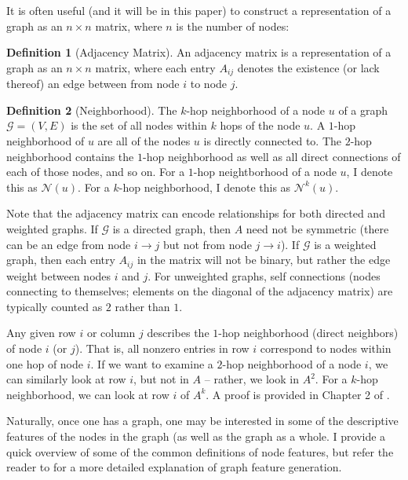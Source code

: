 \documentclass[12pt]{article}
\theoremstyle{definition}
\newtheorem{definition}{Definition}[section]
\begin{document}
It is often useful (and it will be in this paper) to construct a representation of a graph as an $n \times n$ matrix, where $n$ is the number of nodes:

\begin{definition}[Adjacency Matrix]
An adjacency matrix is a representation of a graph as an $n \times n$ matrix, where each entry $A_{ij}$ denotes the existence (or lack thereof) an edge between from node $i$ to node $j$. 
\end{definition}

\begin{definition}[Neighborhood]
The $k$-hop neighborhood of a node $u$ of a graph $\mathcal{G} = (V, E)$ is the set of all nodes within $k$ hops of the node $u$. A $1$-hop neighborhood of $u$ are all of the nodes $u$ is directly connected to. The $2$-hop neighborhood contains the $1$-hop neighborhood as well as all direct connections of each of those nodes, and so on. For a $1$-hop neightborhood of a node $u$, I denote this as $\mathcal{N}(u)$. For a $k$-hop neighborhood, I denote this as $\mathcal{N}^k(u)$.
\end{definition}

Note that the adjacency matrix can encode relationships for both directed and weighted graphs. If $\mathcal{G}$ is a directed graph, then $A$ need not be symmetric (there can be an edge from node $i \rightarrow j$ but not from node $j \rightarrow i$). If $\mathcal{G}$ is a weighted graph, then each entry $A_{ij}$ in the matrix will not be binary, but rather the edge weight between nodes $i$ and $j$. For unweighted graphs, self connections (nodes connecting to themselves; elements on the diagonal of the adjacency matrix) are typically counted as $2$ rather than $1$.

Any given row $i$ or column $j$ describes the $1$-hop neighborhood (direct neighbors) of node $i$ (or $j$). That is, all nonzero entries in row $i$ correspond to nodes within one hop of node $i$. If we want to examine a $2$-hop neighborhood of a node $i$, we can similarly look at row $i$, but not in $A$ -- rather, we look in $A^2$. For a $k$-hop neighborhood, we can look at row $i$ of $A^k$. A proof is provided in Chapter 2 of \cite{hamiltonGRL}.

Naturally, once one has a graph, one may be interested in some of the descriptive features of the nodes in the graph (as well as the graph as a whole. I provide a quick overview of some of the common definitions of node features, but refer the reader to \cite{mdpiGraphFeatureSurvey} for a more detailed explanation of graph feature generation.
\end{document}

